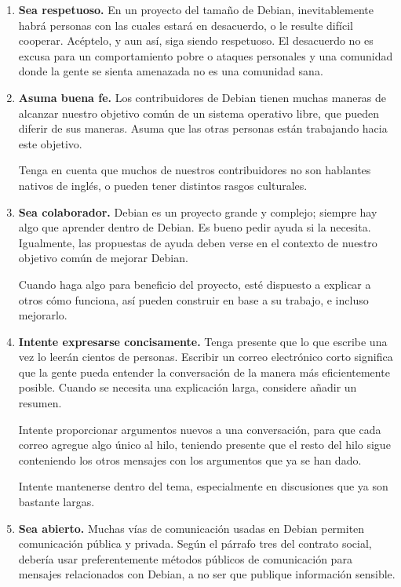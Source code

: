 \begin{enumerate}
\item {\bf Sea respetuoso.} En un proyecto del tamaño de Debian, inevitablemente habrá personas con las cuales estará en desacuerdo, o le resulte difícil cooperar. Acéptelo, y aun así, siga siendo respetuoso. El desacuerdo no es excusa para un comportamiento pobre o ataques personales y una comunidad donde la gente se sienta amenazada no es una comunidad sana.

\item {\bf Asuma buena fe.} Los contribuidores de Debian tienen muchas maneras de alcanzar nuestro objetivo común de un sistema operativo libre, que pueden diferir de sus maneras. Asuma que las otras personas están trabajando hacia este objetivo.

Tenga en cuenta que muchos de nuestros contribuidores no son hablantes nativos de inglés, o pueden tener distintos rasgos culturales.

\item {\bf Sea colaborador.} Debian es un proyecto grande y complejo; siempre hay algo que aprender dentro de Debian. Es bueno pedir ayuda si la necesita. Igualmente, las propuestas de ayuda deben verse en el contexto de nuestro objetivo común de mejorar Debian.

Cuando haga algo para beneficio del proyecto, esté dispuesto a explicar a otros cómo funciona, así pueden construir en base a su trabajo, e incluso mejorarlo.

\item {\bf Intente expresarse concisamente.} Tenga presente que lo que escribe una vez lo leerán cientos de personas. Escribir un correo electrónico corto significa que la gente pueda entender la conversación de la manera más eficientemente posible. Cuando se necesita una explicación larga, considere añadir un resumen.

Intente proporcionar argumentos nuevos a una conversación, para que cada correo agregue algo único al hilo, teniendo presente que el resto del hilo sigue conteniendo los otros mensajes con los argumentos que ya se han dado.

Intente mantenerse dentro del tema, especialmente en discusiones que ya son bastante largas.

\item {\bf Sea abierto.} Muchas vías de comunicación usadas en Debian permiten comunicación pública y privada. Según el párrafo tres del contrato social, debería usar preferentemente métodos públicos de comunicación para mensajes relacionados con Debian, a no ser que publique información sensible.


\end{enumerate}
